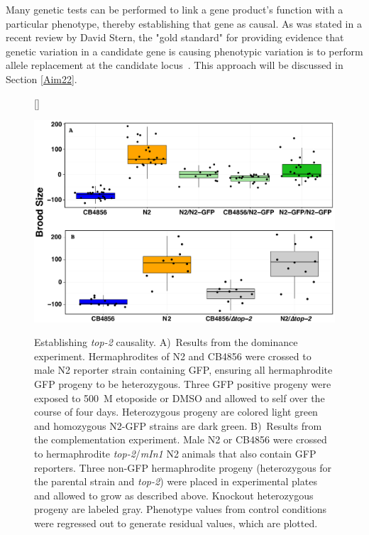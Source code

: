 \documentclass[12pt]{article}
\begin{document}
Many genetic tests can be performed to link a gene product's function with a particular phenotype, thereby establishing that gene as causal. As was stated in a recent review by David Stern, the "gold standard" for providing evidence that genetic variation in a candidate gene is causing phenotypic variation is to perform allele replacement at the candidate locus~\cite{Stern:2014jp}. This approach will be discussed in Section \ref{Aim22}. 

\vspace{5pt}


\begin{figure}[h]
\captionsetup{font=tiny}
[\FBwidth]
{\caption[Establishing {\it top-2} causality]{Establishing {\it top-2} causality. A)~Results from the dominance experiment. Hermaphrodites of N2 and CB4856 were crossed to male N2 reporter strain containing GFP, ensuring all hermaphrodite GFP progeny to be heterozygous. Three GFP positive progeny were exposed to 500~\textmu M etoposide or DMSO and allowed to self over the course of four days. Heterozygous progeny are colored light green and homozygous N2-GFP strains are dark green. B)~Results from the complementation experiment. Male N2 or CB4856 were crossed to hermaphrodite {\it\textDelta top-2}/{\it mIn1} N2 animals that also contain GFP reporters. Three non-GFP hermaphrodite progeny (heterozygous for the parental strain and {\it\textDelta top-2}) were placed in experimental plates and allowed to grow as described above. Knockout heterozygous progeny are labeled gray. Phenotype values from control conditions were regressed out to generate residual values, which are plotted.}\label{DomComp}}
{\includegraphics[scale=0.25]{Figures/Figure3.pdf}}
\end{figure}
\end{document}
